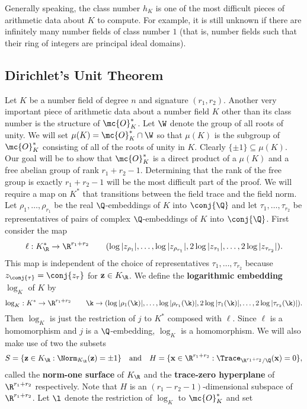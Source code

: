     Generally speaking, the class number $h_{K}$ is one of the most difficult pieces of arithmetic data about $K$ to compute. For example, it is still unknown if there are infinitely many number fields of class number $1$ (that is, number fields such that their ring of integers are principal ideal domains).
  \subsection*{Dirichlet's Unit Theorem}
    Let $K$ be a number field of degree $n$ and signature $(r_{1},r_{2})$. Another very important piece of arithmetic data about a number field $K$ other than its class number is the structure of $\mc{O}_{K}^{\ast}$. Let $\W$ denote the group of all roots of unity. We will set $\mu(K) = \mc{O}_{K}^{\ast} \cap \W$ so that $\mu(K)$ is the subgroup of $\mc{O}_{K}^{\ast}$ consisting of all of the roots of unity in $K$. Clearly $\{\pm 1\} \subseteq \mu(K)$. Our goal will be to show that $\mc{O}_{K}^{\ast}$ is a direct product of a $\mu(K)$ and a free abelian group of rank $r_{1}+r_{2}-1$. Determining that the rank of the free group is exactly $r_{1}+r_{2}-1$ will be the most difficult part of the proof. We will require a map on $K^{\ast}$ that transitions between the field trace and the field norm. Let $\rho_{1},\ldots,\rho_{r_{1}}$ be the real $\Q$-embeddings of $K$ into $\conj{\Q}$ and let $\tau_{1},\ldots,\tau_{r_{2}}$ be representatives of pairs of complex $\Q$-embeddings of $K$ into $\conj{\Q}$. First consider the map
    \[
      \ell:K_{\R}^{\ast} \to \R^{r_{1}+r_{2}} \qquad (\log|z_{\rho_{1}}|,\ldots,\log|z_{\rho_{r_{1}}}|,2\log|z_{\tau_{1}}|,\ldots,2\log|z_{\tau_{r_{2}}}|).
    \]
    This map is independent of the choice of representatives $\tau_{1},\ldots,\tau_{r_{2}}$ because $z_{\conj{\tau}} = \conj{z_{\tau}}$ for $\mathbf{z} \in K_{\R}$.
    We define the \textbf{logarithmic embedding} $\log_{K}$ of $K$ by
    \[
      \log_{K}:K^{\ast} \to \R^{r_{1}+r_{2}} \qquad \k \to (\log|\rho_{1}(\k)|,\ldots,\log|\rho_{r_{1}}(\k)|,2\log|\tau_{1}(\k)|,\ldots,2\log|\tau_{r_{2}}(\k)|).
    \]
    Then $\log_{K}$ is just the restriction of $j$ to $K^{\ast}$ composed with $\ell$. Since $\ell$ is a homomorphism and $j$ is a $\Q$-embedding, $\log_{K}$ is a homomorphism. We will also make use of two the subsets
    \[
      S = \{\mathbf{z} \in K_{\R}:\Norm_{K_{\R}}(\mathbf{z}) = \pm 1\} \quad \text{and} \quad H = \{\mathbf{x} \in \R^{r_{1}+r_{2}}:\Trace_{\R^{r_{1}+r_{2}}/\Q}(\mathbf{x}) = 0\},
    \]
    called the \textbf{norm-one surface} of $K_{\R}$ and the \textbf{trace-zero hyperplane} of $\R^{r_{1}+r_{2}}$ respectively. Note that $H$ is an $(r_{1}-r_{2}-1)$-dimensional subspace of $\R^{r_{1}+r_{2}}$. Let $\l$ denote the restriction of $\log_{K}$ to $\mc{O}_{K}^{\ast}$ and set

